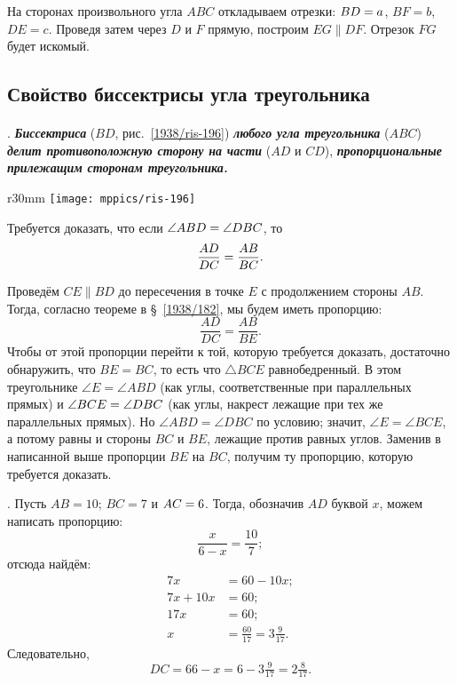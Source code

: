 На сторонах произвольного угла $ABC$ откладываем отрезки:
$BD\z=a$, $BF=b$, $DE=c$.
Проведя затем через $D$ и $F$ прямую, построим $EG\parallel DF$.
Отрезок $FG$ будет искомый.

\subsection*{Свойство биссектрисы угла треугольника}

\paragraph{}\label{1938/186}
.
\textbf{\emph{Биссектриса}} ($BD$, рис.~\ref{1938/ris-196}) \textbf{\emph{любого угла треугольника}} ($ABC$) \textbf{\emph{делит противоположную сторону на части}} ($AD$ и $CD$), \textbf{\emph{пропорциональные прилежащим сторонам треугольника.}}

\begin{wrapfigure}{r}{30mm}
\vskip-4mm
\centering
\texttt{[image: mppics/ris-196]}
\caption{}\label{1938/ris-196}
\end{wrapfigure}

Требуется доказать, что если $\angle ABD\z=\angle DBC$, то 
\[\frac{AD}{DC}\z=\frac{AB}{BC}.\]

Проведём $CE \parallel BD$ до пересечения в точке $E$ с продолжением стороны $AB$.
Тогда, согласно теореме в §~\ref{1938/182}, мы будем иметь пропорцию:
\[\frac{AD}{DC}=\frac{AB}{BE}.\]
Чтобы от этой пропорции перейти к той, которую требуется доказать, достаточно обнаружить, что $BE=BC$, то есть что $\triangle BCE$ равнобедренный.
В этом треугольнике $\angle E=\angle ABD$ (как углы, соответственные при параллельных прямых) и $\angle BCE \z= \angle DBC$ (как углы, накрест лежащие при тех же параллельных прямых).
Но $\angle ABD=\angle DBC$ по условию;
значит, $\angle E = \angle BCE$, а потому равны и стороны $BC$ и $BE$, лежащие против равных углов.
Заменив в написанной выше пропорции $BE$ на $BC$, получим ту пропорцию, которую требуется доказать.

\medskip

\smallskip
{}.
Пусть $AB = 10$;
$BC = 7$ и $AC \z= 6$.
Тогда, обозначив $AD$ буквой $x$, можем написать пропорцию:
\[\frac{x}{6 - x} = \frac{10}7;\]
отсюда найдём:
\begin{align*}
7x&=60-10x;
\\
7x+10x&=60;
\\
17x&=60;
\\
x&=\tfrac{60}{17}=3\tfrac9{17}.
\end{align*}
Следовательно,
\[DC=66-x=6-3\tfrac9{17}=2\tfrac8{17}.\]

